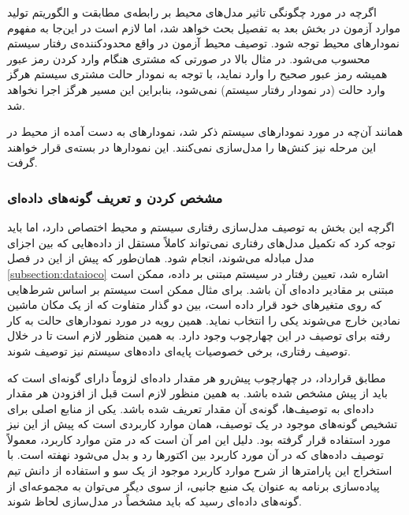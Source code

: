 اگرچه در مورد چگونگی تاثیر مدل‌های محیط بر رابطه‌ی مطابقت و الگوریتم تولید موارد آزمون در بخش بعد به تفصیل بحث خواهد شد، اما لازم است در این‌جا به مفهوم نمودارهای محیط توجه شود. توصیف محیط آزمون در واقع محدودکننده‌ی رفتار سیستم محسوب می‌شود. در مثال بالا در صورتی که مشتری هنگام وارد کردن رمز عبور همیشه رمز عبور صحیح را وارد نماید، با توجه به نمودار حالت مشتری سیستم هرگز وارد حالت  (در نمودار رفتار سیستم) نمی‌شود، بنابراین این مسیر هرگز اجرا نخواهد شد.

همانند آن‌چه در مورد نمودارهای سیستم ذکر شد، نمودارهای به دست آمده از محیط در این مرحله نیز کنش‌ها را مدل‌سازی نمی‌کنند. این نمودارها در بسته‌ی {\large{}} قرار خواهند گرفت.
\subsubsection{مشخص کردن و تعریف گونه‌های داده‌ای}
اگرچه این بخش به توصیف مدل‌سازی رفتاری سیستم و محیط اختصاص دارد، اما باید توجه کرد که تکمیل مدل‌های رفتاری نمی‌تواند کاملاً مستقل از داده‌هایی که بین اجزای مدل مبادله می‌شوند، انجام شود. همان‌طور که پیش از این در فصل \ref{subsection:dataioco} اشاره شد،‌ تعیین رفتار در سیستم مبتنی بر داده، ممکن است مبتنی بر مقادیر داده‌ای آن باشد. برای مثال ممکن است سیستم بر اساس شرط‌هایی که روی متغیرهای خود قرار داده است، بین دو گذار متفاوت که از یک مکان ماشین نمادین خارج می‌شوند یکی را انتخاب نماید. همین رویه در مورد نمودارهای حالت به کار رفته برای توصیف در این چهارچوب وجود دارد. به همین منظور لازم است تا در خلال توصیف رفتاری، برخی خصوصیات پایه‌ای داده‌های سیستم نیز توصیف شوند.

مطابق قرارداد، در چهارچوب پیش‌رو هر مقدار داد‌ه‌ای لزوماً دارای گونه‌ای است که باید از پیش مشخص شده باشد. به همین منظور لازم است قبل از افزودن هر مقدار داده‌ای به توصیف‌ها، گونه‌ی آن مقدار تعریف شده باشد. یکی از منابع اصلی برای تشخیص گونه‌های موجود در یک توصیف، همان موارد کاربردی است که پیش از این نیز مورد استفاده قرار گرفته بود. دلیل این امر آن است که در متن موارد کاربرد، معمولاً توصیف داده‌های که در آن مورد کاربرد بین اکتورها رد و بدل می‌شود نهفته است. با استخراج این پارامترها از شرح موارد کاربرد موجود از یک سو و استفاده از دانش تیم پیاده‌سازی برنامه به عنوان یک منبع جانبی، از سوی دیگر می‌توان به مجموعه‌ای از گونه‌های داده‌ای رسید که باید مشخصاً در مدل‌سازی لحاظ شوند.

